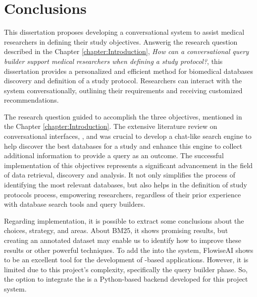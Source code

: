 \chapter{Conclusions}
\label{chapter:Conclusions}





This dissertation proposes developing a conversational system to assist medical researchers in defining their study objectives. Answerig the research question described in the Chapter \ref{chapter:Introduction}, \textit{How can a conversational query builder support medical researchers when defining a study protocol?}, this dissertation provides a personalized and efficient method for biomedical databases discovery and definition of a study protocol. Researchers can interact with the system conversationally, outlining their requirements and receiving customized recommendations.

The research question guided to accomplish the three objectives, mentioned in the Chapter \ref{chapter:Introduction}. The extensive literature review on conversational interfaces, {\nlp}, and {\ir} was crucial to develop a chat-like search engine to help discover the best databases for a study and enhance this engine to collect additional information to provide a query as an outcome. The successful implementation of this objectives represents a significant advancement in the field of data retrieval, discovery and analysis. It not only simplifies the process of identifying the most relevant databases, but also helps in the definition of study protocols process, empowering researchers, regardless of their prior experience with database search tools and query builders.

Regarding implementation, it is possible to extract some conclusions about the choices, strategy, and areas. About BM25, it shows promising results, but creating an annotated dataset may enable us to identify how to improve these results or other powerful {\ir} techniques. To add the {\llm} into the system, FlowiseAI shows to be an excellent tool for the development of {\llm}-based applications. However, it is limited due to this project's complexity, specifically the query builder phase. So, the option to integrate the {\llm} is a Python-based backend developed for this project system.

